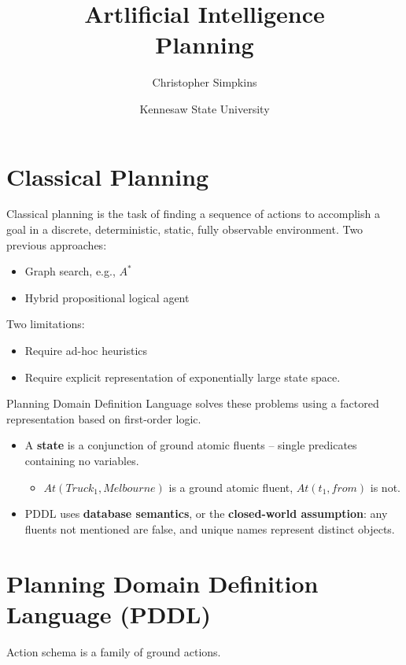 \documentclass[11pt]{article}
\author{Christopher Simpkins}
\date{Kennesaw State University}
\title{Artlificial Intelligence\\\medskip
\large Planning}
\begin{document}
\maketitle
\section{Classical Planning}
\label{sec:org2774430}

Classical planning is the task of finding a sequence of actions to accomplish a goal in a discrete, deterministic, static, fully observable environment.  Two previous approaches:

\begin{itemize}
\item Graph search, e.g., \(A^*\)
\item Hybrid propositional logical agent
\end{itemize}

Two limitations:

\begin{itemize}
\item Require ad-hoc heuristics
\item Require explicit representation of exponentially large state space.
\end{itemize}

Planning Domain Definition Language solves these problems using a factored representation based on first-order logic.

\begin{itemize}
\item A \textbf{state} is a conjunction of ground atomic fluents -- single predicates containing no variables.

\begin{itemize}
\item \(At(Truck_1,Melbourne)\) is a ground atomic fluent, \(At(t_1, from)\) is not.
\end{itemize}

\item PDDL uses \textbf{database semantics}, or the \textbf{closed-world assumption}: any fluents not mentioned are false, and unique names represent distinct objects.
\end{itemize}
\section{Planning Domain Definition Language (PDDL)}
\label{sec:orgae39039}

Action schema is a family of ground actions.
\end{document}
